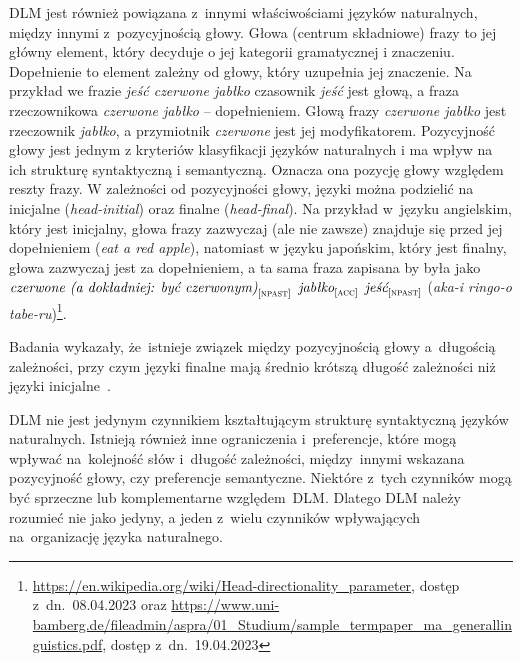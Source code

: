 \documentclass[licencjacka]{pracamgr_Kogni}
\begin{document}
    DLM jest również powiązana z~innymi właściwościami języków naturalnych, między innymi z~pozycyjnością głowy.
    Głowa (centrum składniowe) frazy to jej główny element, który decyduje o jej kategorii gramatycznej i znaczeniu.
    Dopełnienie to element zależny od głowy, który uzupełnia jej znaczenie.
    Na przykład we frazie \textit{jeść czerwone jabłko} czasownik \textit{jeść} jest głową, a fraza rzeczownikowa \textit{czerwone jabłko} -- dopełnieniem.
    Głową frazy \textit{czerwone jabłko} jest rzeczownik \textit{jabłko}, a przymiotnik \textit{czerwone} jest jej modyfikatorem.
    Pozycyjność głowy jest jednym z kryteriów klasyfikacji języków naturalnych i ma wpływ na ich strukturę syntaktyczną i semantyczną.
    Oznacza ona pozycję głowy względem reszty frazy.
    W zależności od pozycyjności głowy, języki można podzielić na inicjalne (\textit{head-initial}) oraz finalne (\textit{head-final}). Na przykład w~języku angielskim, który jest inicjalny, głowa frazy zazwyczaj (ale nie zawsze) znajduje się przed jej dopełnieniem (\textit{eat a red apple}), natomiast w języku japońskim, który jest finalny, głowa zazwyczaj jest za dopełnieniem, a ta sama fraza zapisana by była jako $\textit{czerwone (a dokładniej: być czerwonym)}_{[\textsc{npast}]}$ $\textit{jabłko}_{[\textsc{acc}]}$ $\textit{jeść}_{[\textsc{npast}]}$ (\textit{aka-i ringo-o tabe-ru})\footnote{\url{https://en.wikipedia.org/wiki/Head-directionality_parameter}, dostęp z~dn.~08.04.2023 oraz \url{https://www.uni-bamberg.de/fileadmin/aspra/01_Studium/sample_termpaper_ma_generallinguistics.pdf}, dostęp z~dn.~19.04.2023}.

    Badania wykazały, że~istnieje związek między pozycyjnością głowy a~długością zależności, przy czym języki finalne mają średnio krótszą długość zależności niż języki inicjalne~\citep{FutrellEtAl2015}.

    DLM nie jest jedynym czynnikiem kształtującym strukturę syntaktyczną języków naturalnych.
    Istnieją również inne ograniczenia i~preferencje, które mogą wpływać na~kolejność słów i~długość zależności, między~innymi wskazana pozycyjność głowy, czy preferencje semantyczne.
    Niektóre z~tych czynników mogą być sprzeczne lub komplementarne względem~DLM. Dlatego DLM należy rozumieć nie jako jedyny, a jeden z~wielu czynników wpływających na~organizację języka naturalnego.
\end{document}
